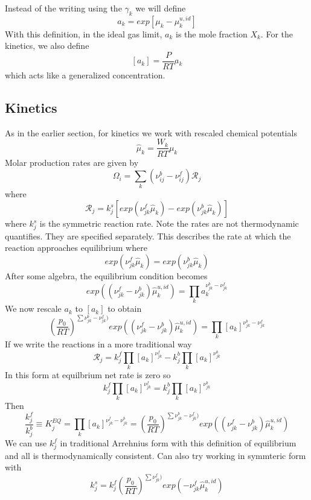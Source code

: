 \documentclass[11pt]{article}
\begin{document}
Instead of the writing using the $\gamma_k$ we will define
\begin{equation}
a_k = exp[\mu_k - \mu_k^{u,id}]
\label{eq:deviate_ideal}
\end{equation}
With this definition, in the ideal gas limit, $a_k$ is the mole fraction $X_k$. For the kinetics,
we also define
\[
[a_k] = \frac{P}{R T}  a_k
\]
which acts like a generalized concentration.

\subsection{Kinetics}

As in the earlier section, for kinetics we work with rescaled chemical potentials
\[
\hat{\mu}_k = \frac{W_k}{R T}  \mu_k
\]
Molar production rates are given by
\[
\Omega_i = \sum_k (\nu_{ij}^b - \nu_{ij}^f) \mathcal{R}_j
\]
where 
\[
\mathcal{R}_j = k_j^s \left [ exp(\nu_{jk}^f \hat{\mu}_k) - exp ( \nu_{jk}^b \hat{\mu}_k) \right ] 
\]
where $k_j^s$ is the symmetric reaction rate.
Note the rates are not thermodynamic quantifies.  They are specified separately.
This describes the rate at which the reaction approaches equilibrium where
\[
 exp(\nu_{jk}^f \hat{\mu}_k) = exp ( \nu_{jk}^b \hat{\mu}_k) 
\]
After some algebra, the equilibrium condition becomes
\begin{equation}
 exp( (\nu_{jk}^f - \nu_{jk}^b) \hat{\mu}_k^{u,id}) = \prod_k a_k^{\nu_{jk}^b-\nu_{jk}^f}
\end{equation}
We now rescale $a_k$ to $[a_k]$ to obtain
\begin{equation}
\left ( \frac{p_0}{R T}  \right )^{\sum \nu_{jk}^b-\nu_{jk}^f) }exp( (\nu_{jk}^f - \nu_{jk}^b) \hat{\mu}_k^{u,id}) = \prod_k [a_k]^{\nu_{jk}^b-\nu_{jk}^f}
\label{eq:kin_equil_sym}
\end{equation}
If we write the reactions in a more traditional way
\begin{equation}
\mathcal{R}_j = k_j^f \prod_k [a_k]^{\nu_{jk}^f}
- k_j^b \prod_k [a_k]^{\nu_{jk}^b}
\end{equation}
In this form at equilbrium net rate is zero so
\begin{equation}
 k_j^f \prod_k [a_k]^{\nu_{jk}^f}
= k_j^b \prod_k [a_k]^{\nu_{jk}^b}
\end{equation}
Then
\begin{equation}
\frac{k_j^f}{k_j^b} \equiv K_j^{EQ} = 
\prod_k [a_k]^{\nu_{jk}^f - \nu_{jk}^b}
= 
\left ( \frac{p_0}{R T}  \right )^{\sum \nu_{jk}^b-\nu_{jk}^f) } exp( (\nu_{jk}^f - \nu_{jk}^b) \hat{\mu}_k^{u,id})
\label{eq:kin_equil_trad}
\end{equation}
We can use $k_j^f$ in traditional Arrehnius form with this definition of equilibrium and all is thermodynamically
consistent.  Can also try working in symmteric form with
\[
k_j^s =  k_j^f 
\left ( \frac{p_0}{R T}  \right )^{\sum \nu_{jk}^f) }exp( -\nu_{jk}^f \hat{\mu}_k^{u,id})
\]
\end{document}
